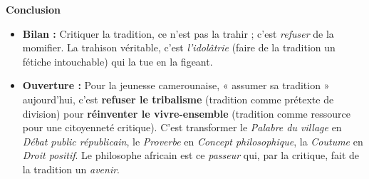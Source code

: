 \documentclass[11pt]{article}
\begin{document}
\begin{corrige}
\textbf{Conclusion}
\begin{itemize}
\item \textbf{Bilan :} Critiquer la tradition, ce n'est pas la trahir ; c'est \emph{refuser} de la momifier. La trahison véritable, c'est \emph{l'idolâtrie} (faire de la tradition un fétiche intouchable) qui la tue en la figeant.
\item \textbf{Ouverture :} Pour la jeunesse camerounaise, « assumer sa tradition » aujourd'hui, c'est \textbf{refuser le tribalisme} (tradition comme prétexte de division) pour \textbf{réinventer le vivre-ensemble} (tradition comme ressource pour une citoyenneté critique). C'est transformer le \emph{Palabre du village} en \emph{Débat public républicain}, le \emph{Proverbe} en \emph{Concept philosophique}, la \emph{Coutume} en \emph{Droit positif}. Le philosophe africain est ce \emph{passeur} qui, par la critique, fait de la tradition un \emph{avenir}.
\end{itemize}
\end{corrige}
\end{document}
